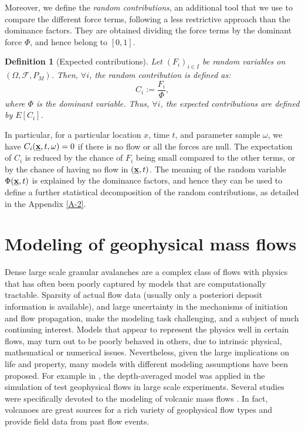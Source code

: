 \documentclass{article}
\newtheorem{definition}[theorem]{Definition}
\begin{document}
Moreover, we define the \emph{random contributions}, an additional tool that we use to compare the different force terms, following a less restrictive approach than the dominance factors. They are obtained dividing the force terms by the dominant force $\Phi$, and hence belong to $[0,1]$.

\begin{definition}[Expected contributions]
Let $(F_i)_{i\in I}$ be random variables on $(\Omega, \mathcal F, P_M)$. Then, $\forall i$, the random contribution is defined as:
$$C_i:=\frac{F_i}{\Phi},$$
where $\Phi$ is the dominant variable. Thus, $\forall i$, the expected contributions are defined by $E\left[C_i\right]$.
\end{definition}

In particular, for a particular location $x$, time $t$, and parameter sample $\omega$, we have $C_i(\underline{\textbf x},t,\omega)=0$ if there is no flow or all the forces are null. The expectation of $C_i$ is reduced by the chance of $F_i$ being small compared to the other terms, or by the chance of having no flow in $(\underline{\textbf x},t)$. The meaning of the random variable $\Phi(\underline{\textbf x},t)$ is explained by the dominance factors, and hence they can be used to define a further statistical decomposition of the random contributions, as detailed in the Appendix \ref{A-2}.

\section{Modeling of geophysical mass flows}\label{subsec:FlowTypes}
Dense large scale granular avalanches are a complex class of flows with physics that has often been poorly captured by models that are computationally tractable. Sparsity of actual flow data (usually only a posteriori deposit information is available), and large uncertainty in the mechanisms of initiation and flow propagation, make the modeling task challenging, and a subject of much continuing interest. Models that appear to represent the physics well in certain flows, may turn out to be poorly behaved in others, due to intrinsic physical, mathematical or numerical issues. Nevertheless, given the large implications on life and property, many models with different modeling assumptions have been proposed. For example in \citep{Iverson1997, Iverson2001, Denlinger2001, Pitman2003a, Denlinger2004, Iverson2004}, the depth-averaged model was applied in the simulation of test geophysical flows in large scale experiments. Several studies were specifically devoted to the modeling of volcanic mass flows \citep{Bursik2005,Kelfoun2005,Charbonnier2009,Kelfoun2009,Procter2010,Kelfoun2011,Charbonnier2013}. In fact, volcanoes are great sources for a rich variety of geophysical flow types and provide field data from past flow events.
\end{document}
